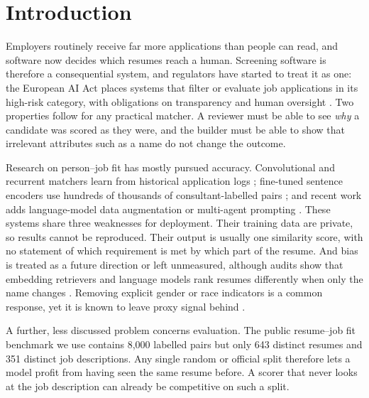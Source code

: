 \section{Introduction}
Employers routinely receive far more applications than people can read, and software now decides
which resumes reach a human. Screening software is therefore a consequential system, and regulators
have started to treat it as one: the European AI Act places systems that filter or evaluate job
applications in its high-risk category, with obligations on transparency and human oversight
\cite{euaiact2024}. Two properties follow for any practical matcher. A reviewer must be able to
see \emph{why} a candidate was scored as they were, and the builder must be able to show that
irrelevant attributes such as a name do not change the outcome.

Research on person--job fit has mostly pursued accuracy. Convolutional and recurrent matchers learn
from historical application logs \cite{zhu2018pjfnn,qin2018apjfnn}; fine-tuned sentence encoders use
hundreds of thousands of consultant-labelled pairs \cite{lavi2021consultantbert}; and recent work
adds language-model data augmentation \cite{yu2024confit,yu2025confitv2} or multi-agent prompting
\cite{lo2025multiagent}. These systems share three weaknesses for deployment. Their training data
are private, so results cannot be reproduced. Their output is usually one similarity score, with
no statement of which requirement is met by which part of the resume. And bias is treated as a
future direction or left unmeasured, although audits show that embedding retrievers and language models
rank resumes differently when only the name changes
\cite{wilson2024silicon,armstrong2024silicon,an2024discriminate,wang2024jobfair}.
Removing explicit gender or race indicators is a common response, yet it is known to leave proxy
signal behind \cite{dearteaga2019biasinbios,gonen2019lipstick}.

A further, less discussed problem concerns evaluation. The public resume--job fit benchmark we use
contains 8{,}000 labelled pairs but only 643 distinct resumes and 351 distinct job descriptions. Any
single random or official split therefore lets a model profit from having seen the same resume
before. A scorer that never looks at the job description can already be competitive on such a split.

